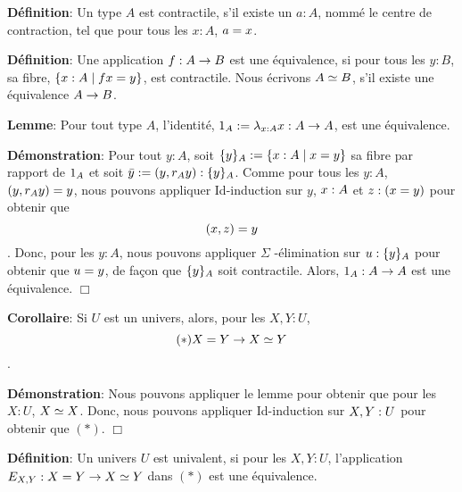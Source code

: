 \documentclass{article}
\begin{document}


\textbf{Définition}:
Un type $A$ est contractile, s'il existe un $a : A$, nommé le centre de contraction, tel que pour tous les $x : A$, $a = x$.

\textbf{Définition}:
Une application $f : A \rightarrow B$ est une équivalence, si pour tous les $y : B$, sa fibre, $\{ x : A \mid f x = y \}$, est contractile.
Nous écrivons $A \simeq B$, s'il existe une équivalence $A \rightarrow B$.

\textbf{Lemme}:
Pour tout type $A$, l'identité, $1_{ A } := \lambda_{x : A} x : A \rightarrow A$, est une équivalence.

\textbf{Démonstration}:
Pour tout $y : A$, soit $\{ y \}_{ A } := \{ x : A \mid x = y \}$ sa fibre par rapport de $1_{ A }$ et soit $\bar{ y } := ( y , r_{ A } y ) : \{ y \}_{ A }$.
Comme pour tous les $y : A$, $( y , r_{ A } y ) = y$, nous pouvons appliquer Id-induction sur $y$, $x : A$ et $z : ( x = y )$ pour obtenir que \[( x , z ) = y\].
Donc, pour les $y : A$, nous pouvons appliquer $\Sigma$ -élimination sur $u : \{ y \}_{ A }$ pour obtenir que $u = y$, de façon que $\{ y \}_{ A }$ soit contractile.
Alors, $1_{ A } : A \rightarrow A$ est une équivalence.
 $\Box$ 

\textbf{Corollaire}:
Si $U$ est un univers, alors, pour les $X , Y : U$, \[(*)X = Y \rightarrow X \simeq Y\].

\textbf{Démonstration}:
Nous pouvons appliquer le lemme pour obtenir que pour les $X : U$, $X \simeq X$.
Donc, nous pouvons appliquer Id-induction sur $X , Y : U$ pour obtenir que $(*)$.
 $\Box$ 


\textbf{Définition}:
Un univers $U$ est univalent, si pour les $X , Y : U$, l'application $E_ { X , Y }: X = Y \rightarrow X \simeq Y$ dans $(*)$ est une équivalence.
\end{document}
